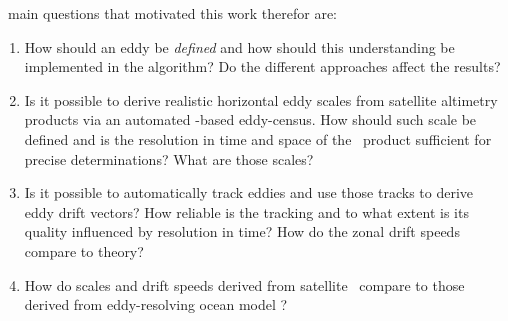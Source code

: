 ~main questions that motivated this work therefor are:
\begin{enumerate}
\setlength\itemsep{1mm}
\item
How should an eddy be \textit{defined} and how should this understanding be implemented in the algorithm? Do the different approaches affect the results?
\item
Is it possible to derive realistic horizontal eddy scales from satellite altimetry products via an automated \SSH-based eddy-census. How should such scale be defined and is the resolution in time and space of the \avi~product sufficient for precise determinations? What are those scales?   
\item
Is it possible to automatically track eddies and use those tracks to derive eddy drift vectors? How reliable is the tracking and to what extent is its quality influenced by resolution in time? How do the zonal drift speeds compare to theory? 
\item
How do scales and drift speeds derived from satellite \SSH~compare to those derived from eddy-resolving ocean model \SSH?
\end{enumerate}

